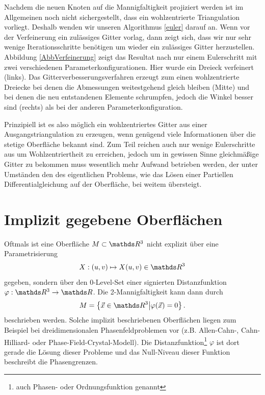       Nachdem die neuen Knoten auf die Mannigfaltigkeit projiziert werden ist im Allgemeinen noch nicht sichergestellt, dass ein wohlzentrierte
      Triangulation vorliegt. Deshalb wenden wir unseren Algorithmus \eqref{euler} darauf an.
      Wenn vor der Verfeinerung ein zulässiges Gitter vorlag, dann zeigt sich, dass wir nur sehr wenige Iterationsschritte benötigen um
      wieder ein
      zulässiges Gitter herzustellen. Abbildung \ref{AbbVerfeinerung} zeigt das Resultat nach nur einem Eulerschritt mit zwei verschiedenen
      Parameterkonfigurationen. Hier wurde ein Dreieck verfeinert (links). Das Gitterverbesserungsverfahren erzeugt zum einen wohlzentrierte
      Dreiecke bei denen die Abmessungen weitestgehend gleich bleiben (Mitte) und bei denen die neu entstandenen Elemente schrumpfen,
      jedoch die Winkel
      besser sind (rechts) als bei der anderen Parameterkonfiguration.

     \begin{fazit}
        Prinzipiell ist es also möglich ein wohlzentriertes Gitter aus einer Ausgangstriangulation zu erzeugen, wenn genügend viele
        Informationen über die stetige Oberfläche bekannt sind. 
        Zum Teil reichen auch nur wenige Eulerschritte aus um Wohlzentriertheit zu erreichen, jedoch um in gewissen Sinne gleichmäßige
        Gitter zu bekommen muss wesentlich mehr Aufwand betrieben werden, der unter Umständen den des eigentlichen Problems, wie das Lösen
        einer Partiellen Differentialgleichung auf der Oberfläche, bei weitem übersteigt.
     \end{fazit}





  \section{Implizit gegebene Oberflächen}
    \label{secImpliziteMannigfaltigkeiten}
    Oftmals ist eine Oberfläche \( M\subset\R^{3} \) nicht explizit über eine Parametrisierung 
    \begin{align}
      X:(u,v)\mapsto X(u,v)\in\R^{3}
    \end{align}
    gegeben, sondern über den 0-Level-Set einer signierten Distanzfunktion \( \varphi:\R^{3}\rightarrow\R \).
    Die 2-Mannigfaltigkeit kann dann durch 
    \begin{align}
      M = \left\{ \vec{x}\in\R^{3} \middle| \varphi(\vec{x})=0 \right\} \text{.}
    \end{align}
    beschrieben werden.
    Solche implizit beschriebenen Oberflächen liegen zum Beispiel bei dreidimensionalen Phasenfeldproblemen vor 
    (z.B. Allen-Cahn-, Cahn-Hilliard- oder Phase-Field-Crystal-Modell). 
    Die Distanzfunktion\footnote{auch Phasen- oder Ordnungsfunktion genannt} \( \varphi\) ist dort gerade die Lösung dieser Probleme
    und das Null-Niveau dieser Funktion beschreibt die Phasengrenzen.


